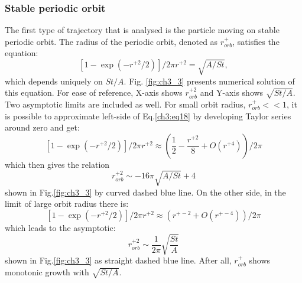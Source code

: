 \documentclass[../main.tex]{subfiles}
\begin{document}
\subsubsection{Stable periodic orbit}
\label{ch3s2ss1sss1}
The first type of trajectory that is analysed is the particle moving on stable periodic orbit. The radius of the periodic orbit, denoted as $r^+_{orb}$, satisfies the equation:
\begin{equation}
 \left[1-\exp\left( -r^{+ 2}/2 \right) \right]/2 \pi r^{+ 2}=\sqrt{A/St}, 
\label{ch3:eq18}
\end{equation}
which depends uniquely on $St/A$. Fig. \ref{fig:ch3_3} presents numerical solution of this equation. For ease of reference, X-axis shows $r^{+ 2}_{orb}$ and Y-axis shows $\sqrt{St/A}$. Two asymptotic limits are included as well. For small orbit radius, $r^+_{orb}<<1$, it is possible to approximate left-side of Eq.\ref{ch3:eq18} by developing Taylor series around zero and get:
\begin{equation}
 \left[1-\exp\left( -r^{+ 2}/2 \right) \right]/2 \pi r^{+ 2}\approx \left(\frac{1}{2}-\frac{r^{+ 2}}{8}+O(r^{+ 4})\right)/2 \pi
\label{ch3:eq18a}
\end{equation}
which then gives the relation
\begin{equation}
r^{+ 2}_{orb} \sim - 16 \pi \sqrt{A/St}+4
\label{ch3:eq18aa}
\end{equation}
shown in Fig.\ref{fig:ch3_3} by curved dashed blue line. On the other side, in the limit of large orbit radius there is:
\begin{equation}
\left[1-\exp\left( -r^{+ 2}/2 \right) \right]/2 \pi r^{+ 2}\approx \left(r^{+ -2}+O(r^{+ -4})\right) /2 \pi
\label{ch3:eq18b}
\end{equation}
which leads to the asymptotic:
\begin{equation}
r^{+ 2}_{orb} \sim \frac{1}{2\pi} \sqrt{\frac{St}{A}}
\label{ch3:eq18c}
\end{equation}
shown in Fig.\ref{fig:ch3_3} as straight dashed blue line. After all, $r^+_{orb}$ shows monotonic growth with $\sqrt{St/A}$.
\end{document}
